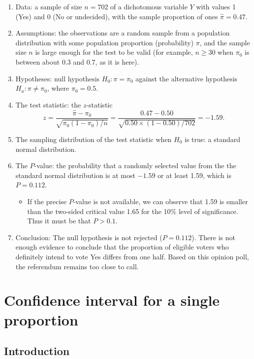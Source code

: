 \documentclass[11pt,a4paper,openany]{book}
\providecommand{\tightlist}{%
  \setlength{\itemsep}{0pt}\setlength{\parskip}{0pt}}
\begin{document}
\begin{enumerate}
\def\labelenumi{\arabic{enumi}.}
\item
  Data: a sample of size \(n=702\) of a dichotomous variable \(Y\) with
  values 1 (Yes) and 0 (No or undecided), with the sample proportion of
  ones \(\hat{\pi}=0.47\).
\item
  Assumptions: the observations are a random sample from a population
  distribution with some population proportion (probability) \(\pi\),
  and the sample size \(n\) is large enough for the test to be valid
  (for example, \(n\ge 30\) when \(\pi_{0}\) is between about 0.3 and
  0.7, as it is here).
\item
  Hypotheses: null hypothesis \(H_{0}: \pi=\pi_{0}\) against the
  alternative hypothesis \(H_{a}: \pi\ne \pi_{0}\), where
  \(\pi_{0}=0.5\).
\item
  The test statistic: the \(z\)-statistic
  \[z=\frac{\hat{\pi}-\pi_{0}}{\sqrt{\pi_{0}(1-\pi_{0})/n}}=
  \frac{0.47-0.50}{\sqrt{0.50\times(1-0.50)/702}}=-1.59.\]
\item
  The sampling distribution of the test statistic when \(H_{0}\) is
  true: a standard normal distribution.
\item
  The \(P\)-value: the probability that a randomly selected value from
  the the standard normal distribution is at most \(-1.59\) or at least
  1.59, which is \(P=0.112\).

  \begin{itemize}
  \tightlist
  \item
    If the precise \(P\)-value is not available, we can observe that
    1.59 is smaller than the two-sided critical value 1.65 for the 10\%
    level of significance. Thus it must be that \(P>0.1\).
  \end{itemize}
\item
  Conclusion: The null hypothesis is not rejected (\(P=0.112\)). There
  is not enough evidence to conclude that the proportion of eligible
  voters who definitely intend to vote Yes differs from one half. Based
  on this opinion poll, the referendum remains too close to call.
\end{enumerate}

\section{Confidence interval for a single
proportion}\label{s-probs-1sampleci}

\subsection{Introduction}\label{s-probs-1sampleci-intro}
\end{document}

